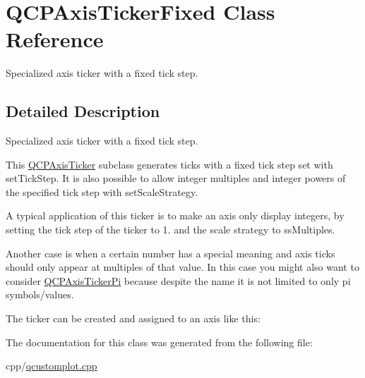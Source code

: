 \hypertarget{class_q_c_p_axis_ticker_fixed}{}\section{Q\+C\+P\+Axis\+Ticker\+Fixed Class Reference}
\label{class_q_c_p_axis_ticker_fixed}


Specialized axis ticker with a fixed tick step.  




\subsection{Detailed Description}
Specialized axis ticker with a fixed tick step. 



This \mbox{\hyperlink{class_q_c_p_axis_ticker}{Q\+C\+P\+Axis\+Ticker}} subclass generates ticks with a fixed tick step set with set\+Tick\+Step. It is also possible to allow integer multiples and integer powers of the specified tick step with set\+Scale\+Strategy.

A typical application of this ticker is to make an axis only display integers, by setting the tick step of the ticker to 1. and the scale strategy to ss\+Multiples.

Another case is when a certain number has a special meaning and axis ticks should only appear at multiples of that value. In this case you might also want to consider \mbox{\hyperlink{class_q_c_p_axis_ticker_pi}{Q\+C\+P\+Axis\+Ticker\+Pi}} because despite the name it is not limited to only pi symbols/values.

The ticker can be created and assigned to an axis like this\+: 
\begin{DoxyCodeInclude}
\end{DoxyCodeInclude}


The documentation for this class was generated from the following file\+:\begin{DoxyCompactItemize}
\item 
cpp/\mbox{\hyperlink{qcustomplot_8cpp}{qcustomplot.\+cpp}}\end{DoxyCompactItemize}
